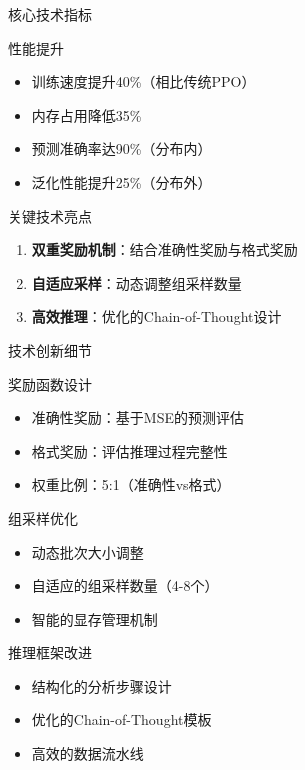 \begin{frame}{核心技术指标}
    \begin{block}{性能提升}
        \begin{itemize}
            \item 训练速度提升40\%（相比传统PPO）
            \item 内存占用降低35\%
            \item 预测准确率达90\%（分布内）
            \item 泛化性能提升25\%（分布外）
        \end{itemize}
    \end{block}
    
    \begin{alertblock}{关键技术亮点}
        \begin{enumerate}
            \item \textbf{双重奖励机制}：结合准确性奖励与格式奖励
            \item \textbf{自适应采样}：动态调整组采样数量
            \item \textbf{高效推理}：优化的Chain-of-Thought设计
        \end{enumerate}
    \end{alertblock}
\end{frame}

\begin{frame}{技术创新细节}
    \begin{block}{奖励函数设计}
        \begin{itemize}
            \item 准确性奖励：基于MSE的预测评估
            \item 格式奖励：评估推理过程完整性
            \item 权重比例：5:1（准确性vs格式）
        \end{itemize}
    \end{block}
    
    \begin{block}{组采样优化}
        \begin{itemize}
            \item 动态批次大小调整
            \item 自适应的组采样数量（4-8个）
            \item 智能的显存管理机制
        \end{itemize}
    \end{block}
    
    \begin{block}{推理框架改进}
        \begin{itemize}
            \item 结构化的分析步骤设计
            \item 优化的Chain-of-Thought模板
            \item 高效的数据流水线
        \end{itemize}
    \end{block}
\end{frame}

